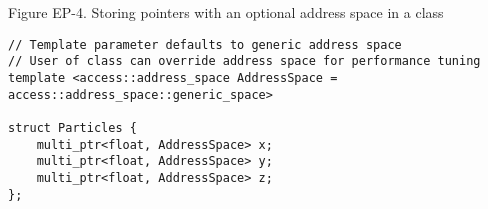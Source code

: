 \hspace*{\fill} \par %
Figure EP-4. Storing pointers with an optional address space in a class
\begin{lstlisting}[caption={}]
// Template parameter defaults to generic address space
// User of class can override address space for performance tuning
template <access::address_space AddressSpace =
access::address_space::generic_space>

struct Particles {
	multi_ptr<float, AddressSpace> x;
	multi_ptr<float, AddressSpace> y;
	multi_ptr<float, AddressSpace> z;
};
\end{lstlisting}





















































